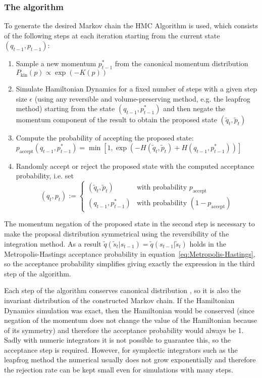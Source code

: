 \subsubsection{The algorithm}
To generate the desired Markov chain the HMC Algorithm \parencite{Neal2011} is used, which consists of the following steps at each iteration starting from the current state $(q_{t-1}, p_{t-1})$:
\begin{enumerate}
\item Sample a new momentum $p^*_{t-1}$ from the canonical momentum distribution $P_\textrm{kin}(p) \propto \exp{(-K(p))}$
\item Simulate Hamiltonian Dynamics for a fixed number of steps with a given step size $\epsilon$ (using any reversible and volume-preserving method, e.g. the leapfrog method) starting from the state $(q_{t-1}, p^*_{t-1})$ and then negate the momentum component of the result to obtain the proposed state $(\tilde{q}_t, \tilde{p}_t)$
\item Compute the probability of accepting the proposed state: \\
$p_{\textrm{accept}}(q_{t-1}, p^*_{t-1}) = \min[1, \exp(-H(\tilde{q}_t, \tilde{p}_t) + H(q_{t-1}, p^*_{t-1}))]$
\item Randomly accept or reject the proposed state with the computed acceptance probability, i.e. set \begin{equation}
(q_t, p_t) := \begin{cases} (\tilde{q}_t, \tilde{p}_t) & \textrm{with probability } p_{\textrm{accept}} \\ 
											(q_{t-1}, p^*_{t-1}) 			& \textrm{with probability } (1 - p_{\textrm{accept}})
					  \end{cases}
\end{equation}
\end{enumerate}
The momentum negation of the proposed state in the second step is necessary to make the proposal distribution symmetrical using the reversibility of the integration method. As a result $\tilde{q}(\tilde{s}_t|s_{t-1}) = \tilde{q}(s_{t-1}|\tilde{s}_t)$ holds in the Metropolis-Hastings acceptance probability in equation~\eqref{eq:Metropolis-Hastings}, so the acceptance probability simplifies giving exactly the expression in the third step of the algorithm.

Each step of the algorithm conserves canonical distribution \parencite{Neal2011}, so it is also the invariant distribution of the constructed Markov chain. If the Hamiltonian Dynamics simulation was exact, then the Hamiltonian would be conserved (since negation of the momentum does not change the value of the Hamiltonian because of its symmetry) and therefore the acceptance probability would always be 1. Sadly with numeric integrators it is not possible to guarantee this, so the acceptance step is required. However, for symplectic integrators such as the leapfrog method the numerical usually does not grow exponentially and therefore the rejection rate can be kept small even for simulations with many steps.


